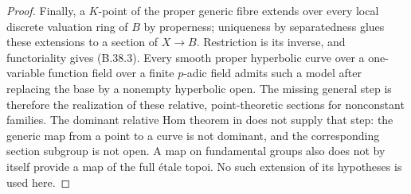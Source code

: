 \documentclass[11pt,oneside]{article}
\begin{document}
\begin{proof}
Finally, a $K$-point of the proper generic fibre
extends over every local discrete valuation ring of
$B$ by properness; uniqueness by separatedness glues
these extensions to a section of $X\to B$.
Restriction is its inverse, and functoriality gives
(B.38.3). Every smooth proper hyperbolic curve over a
one-variable function field over a finite $p$-adic
field admits such a model after replacing the base
by a nonempty hyperbolic open. The missing general
step is therefore the realization of these relative,
point-theoretic sections for nonconstant families.
The dominant relative Hom theorem in
\cite{F-HolzschuhSchmidtStix} does not supply that
step: the generic map from a point to a curve is not
dominant, and the corresponding section subgroup is
not open. A map on fundamental groups also does not
by itself provide a map of the full \'etale topoi.
No such extension of its hypotheses is used here.
\end{proof}
\end{document}
